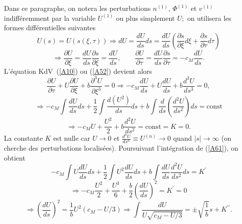 \documentclass[10pt,thmsa]{article}
\begin{document}
Dans ce paragraphe, on notera les perturbations $n^{(1)}$, $\Phi^{(1)}$ et
$v^{(1)}$ indiff\'{e}remment par la variable $U^{(1)}$ ou plus simplement $U;$
on utilisera les formes diff\'{e}rentielles suivantes
\begin{equation}
U(s)=U(s(\xi,\tau))\Rightarrow dU=\frac{dU}{ds}ds=\frac{dU}{ds}(\frac{\partial
s}{\partial\xi}d\xi+\frac{\partial s}{\partial\tau}d\tau)\label{A56}%
\end{equation}
\begin{equation}
\Rightarrow\frac{\partial U}{\partial\xi}=\frac{dU}{ds}\frac{\partial
s}{\partial\xi}=\frac{dU}{ds},\qquad\frac{\partial U}{\partial\tau}=\frac
{dU}{ds}\frac{\partial s}{\partial\tau}=-c_{M}\frac{dU}{ds}.\label{A57}%
\end{equation}
L'\'{e}quation KdV\ (\ref{A10}) ou (\ref{A52}) devient alors
\begin{equation}
\frac{\partial U}{\partial\tau}+U\frac{\partial U}{\partial\xi}+b\frac
{\partial^{3}U}{\partial\xi^{3}}=0\Rightarrow-c_{M}\frac{dU}{ds}+U\frac
{dU}{ds}+b\frac{d^{3}U}{ds^{3}}=0,\label{A59}%
\end{equation}
\begin{equation}
\Rightarrow-c_{M}\int\frac{dU}{ds}ds+\frac{1}{2}\int\frac{d(U^{2})}%
{ds}ds+b\int\frac{d}{ds}\left(  \frac{d^{2}U}{ds^{2}}\right)
ds=\mathrm{const}\label{A60}%
\end{equation}
\begin{equation}
\Rightarrow-c_{M}U+\frac{U^{2}}{2}+b\frac{d^{2}U}{ds^{2}}=\mathrm{const}%
=K=0.\label{A61}%
\end{equation}
La constante $K$ est nulle car $U\rightarrow0$ et $\frac{d^{n}U}{ds^{n}}\equiv
U^{(n)}\rightarrow0$ quand $\left|  s\right|  \rightarrow\infty$ (on cherche
des perturbations localis\'{e}es). Poursuivant l'int\'{e}gration de
(\ref{A61}), on obtient
\begin{equation}
-c_{M}\int U\frac{dU}{ds}ds+\frac{1}{2}\int U^{2}\frac{dU}{ds}ds+b\int%
\frac{dU}{ds}\frac{d^{2}U}{ds^{2}}ds=K^{\prime}\label{A62}%
\end{equation}
\begin{equation}
\Rightarrow-c_{M}\frac{U^{2}}{2}+\frac{U^{3}}{6}+\frac{b}{2}\left(  \frac
{dU}{ds}\right)  ^{2}=K^{\prime}=0\label{A63}%
\end{equation}
\begin{equation}
\Rightarrow\left(  \frac{dU}{ds}\right)  ^{2}=\frac{1}{b}U^{2}(c_{M}%
-U/3)\Rightarrow\int\frac{dU}{U\sqrt{c_{M}-U/3}}=\pm\sqrt{\frac{1}{b}%
}s+K^{\prime\prime}.\label{A64}%
\end{equation}
\end{document}
